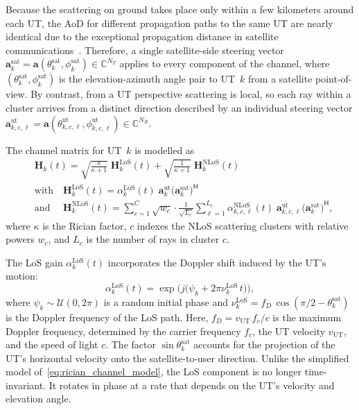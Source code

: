 Because the scattering on ground takes place only within a few kilometers around each \ac{UT}, the \ac{AoD} for different propagation paths to the same \ac{UT} are nearly identical due to the exceptional propagation distance in satellite communications~\cite{chinese0_massive_mimo_leo}.
Therefore, a single satellite-side steering vector $\mathbf{a}^{\mathrm{sat}}_k = \mathbf{a}(\theta^{\mathrm{sat}}_k, \phi^{\mathrm{sat}}_k)
\in \mathbb{C}^{N_T}$ applies to every component of the channel, where $(\theta^{\mathrm{sat}}_k, \phi^{\mathrm{sat}}_k)$ is the elevation-azimuth angle pair to \ac{UT}~$k$ from a satellite point-of-view.
By contrast, from a \ac{UT} perspective scattering is local, so each ray within a cluster arrives from a distinct direction described by an individual steering vector $\mathbf{a}^{\mathrm{ut}}_{k,c,\ell} = \mathbf{a}(\theta^{\mathrm{ut}}_{k,c,\ell}, \phi^{\mathrm{ut}}_{k,c,\ell}) \in \mathbb{C}^{N_R}$.

The channel matrix for \ac{UT}~$k$ is modelled as
\begin{equation}
\label{eq:satellite_channel_model}
\begin{aligned}
    &\mathbf{H}_k(t) = \sqrt{\frac{\kappa}{\kappa+1}} \; \mathbf{H}_k^{\mathrm{LoS}}(t) + \sqrt{\frac{1}{\kappa+1}} \; \mathbf{H}_k^{\mathrm{NLoS}}(t) \\
    &\text{with} \quad \mathbf{H}_k^{\mathrm{LoS}}(t) = \alpha_k^{\mathrm{LoS}}(t) \; \mathbf{a}^{\mathrm{ut}}_k \bigl(\mathbf{a}^{\mathrm{sat}}_k\bigr)^{\!\mathsf{H}} \\
    &\text{and } \quad \mathbf{H}_k^{\mathrm{NLoS}}(t) = \sum_{c=1}^{C} \sqrt{w_c} \cdot \frac{1}{\sqrt{L_c}} \sum_{\ell=1}^{L_c} \alpha_{k,c,\ell}^{\mathrm{NLoS}}(t) \; \mathbf{a}^{\mathrm{ut}}_{k,c,\ell} \bigl(\mathbf{a}^{\mathrm{sat}}_k\bigr)^{\!\mathsf{H}},
\end{aligned}
\end{equation}
where $\kappa$ is the Rician factor, $c$ indexes the \ac{NLoS} scattering clusters with relative powers $w_c$, and $L_c$ is the number of rays
in cluster $c$.

The \ac{LoS} gain $\alpha_k^{\mathrm{LoS}}(t)$ incorporates the Doppler shift induced by the \ac{UT}'s motion:
\begin{equation}
\label{eq:los_gain}
    \alpha_k^{\mathrm{LoS}}(t) = \exp\bigl(j\bigl(\psi_k + 2\pi\nu_k^{\mathrm{LoS}}\,t\bigr)\bigr),
\end{equation}
where $\psi_k \sim \mathcal{U}(0, 2\pi)$ is a random initial phase and $\nu_k^{\mathrm{LoS}} = f_D \, \cos(\pi/2 - \theta^{\mathrm{sat}}_k)$ is the Doppler frequency of the \ac{LoS} path.
Here, $f_D = v_{\mathrm{UT}} \, f_c / c$ is the maximum Doppler frequency, determined by the carrier frequency $f_c$, the \ac{UT} velocity $v_{\mathrm{UT}}$, and the speed of light $c$.
The factor $\sin\theta^{\mathrm{sat}}_k$ accounts for the projection of the \ac{UT}'s horizontal velocity onto the satellite-to-user direction.
Unlike the simplified model of~\eqref{eq:rician_channel_model}, the \ac{LoS} component is no longer time-invariant. It rotates in phase at a rate that depends on the \ac{UT}'s velocity and elevation angle.

